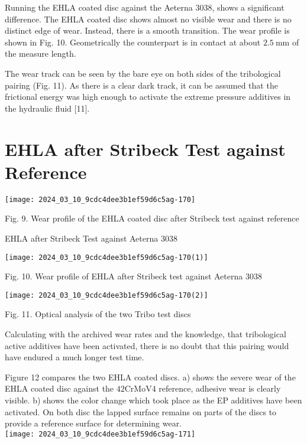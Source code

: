 \documentclass[10pt]{article}
\begin{document}
Running the EHLA coated disc against the Aeterna 3038, shows a significant difference. The EHLA coated disc shows almost no visible wear and there is no distinct edge of wear. Instead, there is a smooth transition. The wear profile is shown in Fig. 10. Geometrically the counterpart is in contact at about $2.5 \mathrm{~mm}$ of the measure length.

The wear track can be seen by the bare eye on both sides of the tribological pairing (Fig. 11). As there is a clear dark track, it can be assumed that the frictional energy was high enough to activate the extreme pressure additives in the hydraulic fluid [11].

\section*{EHLA after Stribeck Test against Reference}
\begin{center}
\texttt{[image: 2024\_03\_10\_9cdc4dee3b1ef59d6c5ag-170]}
\end{center}

Fig. 9. Wear profile of the EHLA coated disc after Stribeck test against reference

EHLA after Stribeck Test against Aeterna 3038

\begin{center}
\texttt{[image: 2024\_03\_10\_9cdc4dee3b1ef59d6c5ag-170(1)]}
\end{center}

Fig. 10. Wear profile of EHLA after Stribeck test against Aeterna 3038

\begin{center}
\texttt{[image: 2024\_03\_10\_9cdc4dee3b1ef59d6c5ag-170(2)]}
\end{center}

Fig. 11. Optical analysis of the two Tribo test discs

Calculating with the archived wear rates and the knowledge, that tribological active additives have been activated, there is no doubt that this pairing would have endured a much longer test time.

Figure 12 compares the two EHLA coated discs. a) shows the severe wear of the EHLA coated disc against the $42 \mathrm{CrMoV} 4$ reference, adhesive wear is clearly visible. b) shows the color change which took place as the EP additives have been activated. On both disc the lapped surface remains on parts of the discs to provide a reference surface for determining wear.\\
\texttt{[image: 2024\_03\_10\_9cdc4dee3b1ef59d6c5ag-171]}
\end{document}
